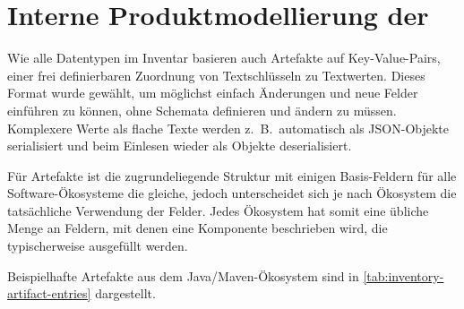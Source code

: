 \section{Interne Produktmodellierung der \metaeffektlg}\label{sec:metaeffekt-inventory-format}

Wie alle Datentypen im Inventar basieren auch Artefakte auf Key-Value-Pairs, einer frei definierbaren Zuordnung von Textschlüsseln zu Textwerten.
Dieses Format wurde gewählt, um möglichst einfach Änderungen und neue Felder einführen zu können, ohne Schemata definieren und ändern zu müssen.
Komplexere Werte als flache Texte werden z.\ B.\ automatisch als JSON-Objekte serialisiert und beim Einlesen wieder als Objekte deserialisiert.

Für Artefakte ist die zugrundeliegende Struktur mit einigen Basis-Feldern für alle Software-Ökosysteme die gleiche, jedoch unterscheidet sich je nach Ökosystem die tatsächliche Verwendung der Felder.
Jedes Ökosystem hat somit eine übliche Menge an Feldern, mit denen eine Komponente beschrieben wird, die typischerweise ausgefüllt werden.

Beispielhafte Artefakte aus dem Java/Maven-Ökosystem sind in \autoref{tab:inventory-artifact-entries} dargestellt.

\begin{table}[ht]
    \centering
    \caption{Beispielhafte Artefakteinträge in einem Software-Inventar}
    \label{tab:inventory-artifact-entries}
\end{table}

